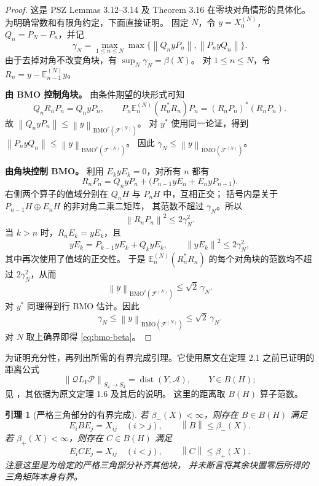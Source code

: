 \documentclass[UTF8,11pt,a4paper,fontset=fandol]{ctexart}
\newtheorem{lemma}[theorem]{引理}
\theoremstyle{remark}
\newcommand{\BH}{B(H)}
\newcommand{\dist}{\operatorname{dist}}
\newcommand{\PP}{\mathcal P}
\newcommand{\QQ}{\mathcal Q}
\newcommand{\Alg}{\mathcal A}
\newcommand{\norm}[1]{\left\lVert #1\right\rVert}
\numberwithin{equation}{section}
\begin{document}
\begin{proof}
这是 PSZ Lemmas 3.12--3.14 及 Theorem 3.16 在零块对角情形的具体化。
为明确常数和有限角约定，下面直接证明。
固定 $N$，令 $y=X_0^{(N)}$，$Q_n=P_N-P_n$，并记
\[
 \gamma_N=\max_{1\leq n\leq N}\max\{
   \norm{Q_nyP_n},\norm{P_nyQ_n}\}.
\]
由于去掉对角不改变角块，有 $\sup_N\gamma_N=\beta(X)$。
对 $1\leq n\leq N$，令 $R_n=y-\mathbb E_{n-1}^{(N)}y$。

\medskip
\textbf{由 BMO 控制角块。}
由条件期望的块形式可知
\[
 Q_nR_nP_n=Q_nyP_n,\qquad
 P_n\mathbb E_n^{(N)}(R_n^*R_n)P_n
   =(R_nP_n)^*(R_nP_n).
\]
故 $\norm{Q_nyP_n}\leq\norm y_{\mathrm{BMO}^{c}(\mathcal F^{(N)})}$。
对 $y^*$ 使用同一论证，得到
$\norm{P_nyQ_n}\leq\norm y_{\mathrm{BMO}^{r}(\mathcal F^{(N)})}$。
因此 $\gamma_N\leq\norm y_{\mathrm{BMO}(\mathcal F^{(N)})}$。

\medskip
\textbf{由角块控制 BMO。}
利用 $E_kyE_k=0$，对所有 $n$ 都有
\[
 R_nP_n=Q_nyP_n+
       \bigl(P_{n-1}yE_n+E_nyP_{n-1}\bigr).
\]
右侧两个算子的值域分别在 $Q_nH$ 与 $P_nH$ 中，互相正交；
括号内是关于 $P_{n-1}H\oplus E_nH$ 的非对角二乘二矩阵，
其范数不超过 $\gamma_N$。所以
\[
 \norm{R_nP_n}^{2}\leq2\gamma_N^2.
\]
当 $k>n$ 时，$R_nE_k=yE_k$，且
\[
 yE_k=P_{k-1}yE_k+Q_kyE_k,
 \qquad \norm{yE_k}^{2}\leq2\gamma_N^2,
\]
其中再次使用了值域的正交性。
于是 $\mathbb E_n^{(N)}(R_n^*R_n)$ 的每个对角块的范数均不超过
$2\gamma_N^2$，从而
\[
 \norm y_{\mathrm{BMO}^{c}(\mathcal F^{(N)})}
 \leq\sqrt2\,\gamma_N.
\]
对 $y^*$ 同理得到行 BMO 估计。因此
\[
 \gamma_N\leq\norm y_{\mathrm{BMO}(\mathcal F^{(N)})}
       \leq\sqrt2\,\gamma_N.
\]
对 $N$ 取上确界即得 \eqref{eq:bmo-beta}。
\end{proof}
为证明充分性，再列出所需的有界完成引理。它使用原文在定理 2.1
之前已证明的距离公式
\begin{equation}\label{eq:nehari}
 \norm{\QQ L_Y\PP}_{S_2\to S_2}=\dist(Y,\Alg),
 \qquad Y\in\BH;
\end{equation}
见 \cite[p.~277]{Power}，其依据为原文定理 1.6 及其后的说明。
这里的距离取 $B(H)$ 算子范数。

\begin{lemma}[严格三角部分的有界完成]\label{lem:completion}
若 $\beta_-(X)<\infty$，则存在 $B\in\BH$ 满足
\[
 E_iBE_j=X_{ij}\quad(i>j),\qquad
 \norm B\leq\beta_-(X).
\]
若 $\beta_+(X)<\infty$，则存在 $C\in\BH$ 满足
\[
 E_iCE_j=X_{ij}\quad(i<j),\qquad
 \norm C\leq\beta_+(X).
\]
注意这里是为给定的严格三角部分\emph{补齐其他块}，
并未断言将其余块置零后所得的三角矩阵本身有界。
\end{lemma}
\end{document}
